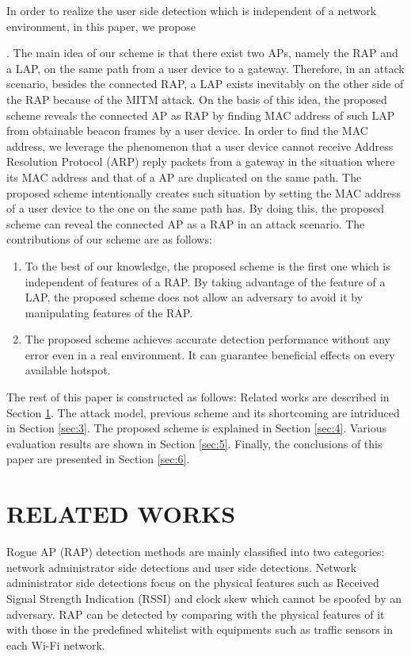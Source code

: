 \documentclass[conference]{IEEEtran}
\begin{document}
In order to realize the user side detection which is independent of a network environment, in this paper, we propose \title{} .
The main idea of our scheme is that there exist two APs, namely the RAP and a LAP, on the same path from a user device to a gateway.
Therefore, in an attack scenario, besides the connected RAP, a LAP exists inevitably on the other side of the RAP because of the MITM attack.
On the basis of this idea, the proposed scheme reveals the connected AP as RAP by finding MAC address of such LAP from obtainable beacon frames by a user device.
In order to find the MAC address, we leverage the phenomenon that a user device cannot receive Address Resolution Protocol (ARP) reply packets from a gateway in the situation where its MAC address and that of a AP are duplicated on the same path.
The proposed scheme intentionally creates such situation by setting the MAC address of a user device to the one on the same path has.
By doing this, the proposed scheme can reveal the connected AP as a RAP in an attack scenario.
The contributions of our scheme are as follows:
\begin{enumerate}
    \renewcommand{\labelenumi}{\arabic{enumi}).}
    \item To the best of our knowledge, the proposed scheme is the first one which is independent of features of a RAP. By taking advantage of the feature of a LAP, the proposed scheme does not allow an adversary to avoid it by manipulating features of the RAP.
    \item The proposed scheme achieves accurate detection performance without any error even in a real environment. It can guarantee beneficial effects on every available hotspot.
\end{enumerate}
The rest of this paper is constructed as follows: Related works are described in Section \ref{sec:2}.
The attack model, previous scheme and its shortcoming are intriduced in Section \ref{sec:3}.
The proposed scheme is explained in Section \ref{sec:4}.
Various evaluation results are shown in Section \ref{sec:5}.
Finally, the conclusions of this paper are presented in Section \ref{sec:6}.

\section{RELATED WORKS}\label{sec:2}
Rogue AP (RAP) detection methods are mainly classified into two categories: network administrator side detections and user side detections.
Network administrator side detections focus on the physical features such as Received Signal Strength Indication (RSSI) and clock skew which cannot be spoofed by an adversary.
RAP can be detected by comparing with the physical features of it with those in the predefined whitelist with equipments such as traffic sensors in each Wi-Fi network.
\end{document}

